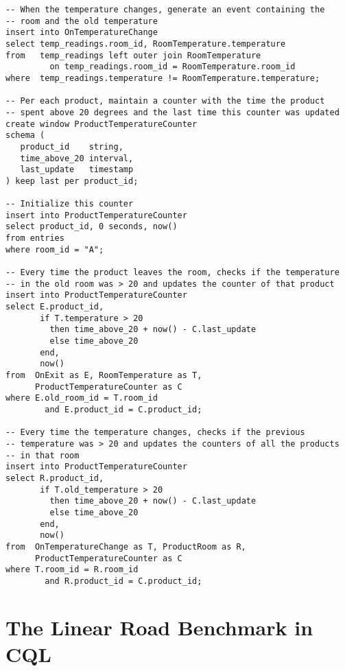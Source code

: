 \begin{lstlisting}
-- When the temperature changes, generate an event containing the
-- room and the old temperature
insert into OnTemperatureChange
select temp_readings.room_id, RoomTemperature.temperature
from   temp_readings left outer join RoomTemperature
         on temp_readings.room_id = RoomTemperature.room_id
where  temp_readings.temperature != RoomTemperature.temperature;

-- Per each product, maintain a counter with the time the product
-- spent above 20 degrees and the last time this counter was updated
create window ProductTemperatureCounter
schema (
   product_id    string,
   time_above_20 interval,
   last_update   timestamp
) keep last per product_id;

-- Initialize this counter
insert into ProductTemperatureCounter
select product_id, 0 seconds, now()
from entries
where room_id = "A";

-- Every time the product leaves the room, checks if the temperature
-- in the old room was > 20 and updates the counter of that product
insert into ProductTemperatureCounter
select E.product_id,
       if T.temperature > 20
         then time_above_20 + now() - C.last_update
         else time_above_20
       end,
       now()
from  OnExit as E, RoomTemperature as T,
      ProductTemperatureCounter as C
where E.old_room_id = T.room_id
        and E.product_id = C.product_id;

-- Every time the temperature changes, checks if the previous
-- temperature was > 20 and updates the counters of all the products
-- in that room
insert into ProductTemperatureCounter
select R.product_id,
       if T.old_temperature > 20
         then time_above_20 + now() - C.last_update
         else time_above_20
       end,
       now()
from  OnTemperatureChange as T, ProductRoom as R,
      ProductTemperatureCounter as C
where T.room_id = R.room_id
        and R.product_id = C.product_id;
\end{lstlisting}

\section{The Linear Road Benchmark in CQL}
\label{sec:lrb-cql}

\lstset{
  language=CQL,
  columns=fullflexible,
  basicstyle=\tt,
  keywordstyle=[1]\bf,
  keywordstyle=[2]\it,
}


